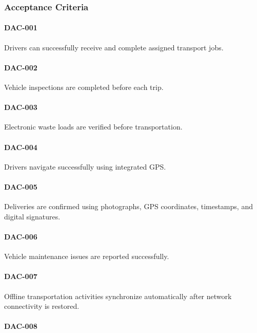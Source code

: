 \subsubsection*{Acceptance Criteria}

\paragraph{DAC-001}

Drivers can successfully receive and complete assigned transport jobs.

\paragraph{DAC-002}

Vehicle inspections are completed before each trip.

\paragraph{DAC-003}

Electronic waste loads are verified before transportation.

\paragraph{DAC-004}

Drivers navigate successfully using integrated GPS.

\paragraph{DAC-005}

Deliveries are confirmed using photographs, GPS coordinates,
timestamps, and digital signatures.

\paragraph{DAC-006}

Vehicle maintenance issues are reported successfully.

\paragraph{DAC-007}

Offline transportation activities synchronize automatically after
network connectivity is restored.

\paragraph{DAC-008}


